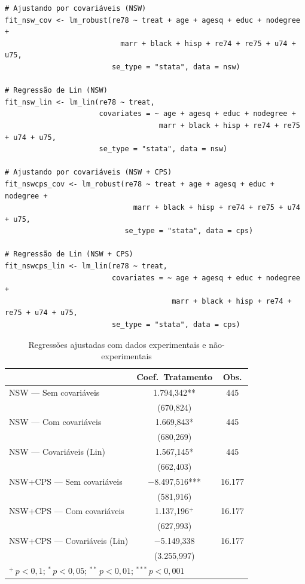 \documentclass[12pt,a4paper]{article}
\begin{document}
\begin{lstlisting}[style=Rstyle]
# Ajustando por covariáveis (NSW)
fit_nsw_cov <- lm_robust(re78 ~ treat + age + agesq + educ + nodegree +
                           marr + black + hisp + re74 + re75 + u74 + u75,
                         se_type = "stata", data = nsw)

# Regressão de Lin (NSW)
fit_nsw_lin <- lm_lin(re78 ~ treat,
                      covariates = ~ age + agesq + educ + nodegree +
                                    marr + black + hisp + re74 + re75 + u74 + u75,
                      se_type = "stata", data = nsw)

# Ajustando por covariáveis (NSW + CPS)
fit_nswcps_cov <- lm_robust(re78 ~ treat + age + agesq + educ + nodegree +
                              marr + black + hisp + re74 + re75 + u74 + u75,
                            se_type = "stata", data = cps)

# Regressão de Lin (NSW + CPS)
fit_nswcps_lin <- lm_lin(re78 ~ treat,
                         covariates = ~ age + agesq + educ + nodegree +
                                       marr + black + hisp + re74 + re75 + u74 + u75,
                         se_type = "stata", data = cps)
\end{lstlisting}

\begin{table}[H]
\centering
\caption{Regressões ajustadas com dados experimentais e não-experimentais}\label{tab:reg3}
\begin{tabular}{lcc}
\toprule
 & Coef.\ Tratamento & Obs. \\
\midrule
NSW --- Sem covariáveis                & 1.794,342** & 445 \\
                                       & (670,824) & \\
NSW --- Com covariáveis                & 1.669,843* & 445 \\
                                       & (680,269) & \\
NSW --- Covariáveis (Lin) \hspace{20mm}& 1.567,145* & 445 \\
                                       & (662,403) & \\
NSW+CPS --- Sem covariáveis            & $-$8.497,516*** & 16.177 \\
                                       & (581,916) & \\
NSW+CPS --- Com covariáveis            & 1.137,196$^+$ & 16.177 \\
                                       & (627,993) & \\
NSW+CPS --- Covariáveis (Lin)          & $-$5.149,338 & 16.177 \\
                                       & (3.255,997) & \\
\bottomrule
\multicolumn{3}{l}{\footnotesize $^{+}\,p<0{,}1$;\; $^{*}\,p<0{,}05$;\; $^{**}\,p<0{,}01$;\; $^{***}\,p<0{,}001$}\\
\end{tabular}
\end{table}
\end{document}
